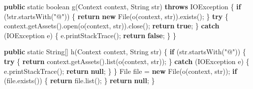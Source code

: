 \documentclass[
]{article}
\newenvironment{Shaded}{}{}
\newcommand{\BuiltInTok}[1]{\textcolor[rgb]{0.00,0.50,0.00}{#1}}
\newcommand{\ControlFlowTok}[1]{\textcolor[rgb]{0.00,0.44,0.13}{\textbf{#1}}}
\newcommand{\DataTypeTok}[1]{\textcolor[rgb]{0.56,0.13,0.00}{#1}}
\newcommand{\FunctionTok}[1]{\textcolor[rgb]{0.02,0.16,0.49}{#1}}
\newcommand{\KeywordTok}[1]{\textcolor[rgb]{0.00,0.44,0.13}{\textbf{#1}}}
\newcommand{\NormalTok}[1]{#1}
\newcommand{\OperatorTok}[1]{\textcolor[rgb]{0.40,0.40,0.40}{#1}}
\newcommand{\StringTok}[1]{\textcolor[rgb]{0.25,0.44,0.63}{#1}}
\begin{document}
\begin{Shaded}
\begin{Highlighting}[]
    \KeywordTok{public} \DataTypeTok{static} \DataTypeTok{boolean} \FunctionTok{g}\OperatorTok{(}\BuiltInTok{Context}\NormalTok{ context}\OperatorTok{,} \BuiltInTok{String}\NormalTok{ str}\OperatorTok{)} \KeywordTok{throws} \BuiltInTok{IOException} \OperatorTok{\{}
        \ControlFlowTok{if} \OperatorTok{(!}\NormalTok{str}\OperatorTok{.}\FunctionTok{startsWith}\OperatorTok{(}\StringTok{"@"}\OperatorTok{))} \OperatorTok{\{}
            \ControlFlowTok{return} \KeywordTok{new} \BuiltInTok{File}\OperatorTok{(}\FunctionTok{o}\OperatorTok{(}\NormalTok{context}\OperatorTok{,}\NormalTok{ str}\OperatorTok{)).}\FunctionTok{exists}\OperatorTok{();}
        \OperatorTok{\}}
        \ControlFlowTok{try} \OperatorTok{\{}
\NormalTok{            context}\OperatorTok{.}\FunctionTok{getAssets}\OperatorTok{().}\FunctionTok{open}\OperatorTok{(}\FunctionTok{o}\OperatorTok{(}\NormalTok{context}\OperatorTok{,}\NormalTok{ str}\OperatorTok{)).}\FunctionTok{close}\OperatorTok{();}
            \ControlFlowTok{return} \KeywordTok{true}\OperatorTok{;}
        \OperatorTok{\}} \ControlFlowTok{catch} \OperatorTok{(}\BuiltInTok{IOException}\NormalTok{ e}\OperatorTok{)} \OperatorTok{\{}
\NormalTok{            e}\OperatorTok{.}\FunctionTok{printStackTrace}\OperatorTok{();}
            \ControlFlowTok{return} \KeywordTok{false}\OperatorTok{;}
        \OperatorTok{\}}
    \OperatorTok{\}}

    \KeywordTok{public} \DataTypeTok{static} \BuiltInTok{String}\OperatorTok{[]} \FunctionTok{h}\OperatorTok{(}\BuiltInTok{Context}\NormalTok{ context}\OperatorTok{,} \BuiltInTok{String}\NormalTok{ str}\OperatorTok{)} \OperatorTok{\{}
        \ControlFlowTok{if} \OperatorTok{(}\NormalTok{str}\OperatorTok{.}\FunctionTok{startsWith}\OperatorTok{(}\StringTok{"@"}\OperatorTok{))} \OperatorTok{\{}
            \ControlFlowTok{try} \OperatorTok{\{}
                \ControlFlowTok{return}\NormalTok{ context}\OperatorTok{.}\FunctionTok{getAssets}\OperatorTok{().}\FunctionTok{list}\OperatorTok{(}\FunctionTok{o}\OperatorTok{(}\NormalTok{context}\OperatorTok{,}\NormalTok{ str}\OperatorTok{));}
            \OperatorTok{\}} \ControlFlowTok{catch} \OperatorTok{(}\BuiltInTok{IOException}\NormalTok{ e}\OperatorTok{)} \OperatorTok{\{}
\NormalTok{                e}\OperatorTok{.}\FunctionTok{printStackTrace}\OperatorTok{();}
                \ControlFlowTok{return} \KeywordTok{null}\OperatorTok{;}
            \OperatorTok{\}}
        \OperatorTok{\}}
        \BuiltInTok{File}\NormalTok{ file }\OperatorTok{=} \KeywordTok{new} \BuiltInTok{File}\OperatorTok{(}\FunctionTok{o}\OperatorTok{(}\NormalTok{context}\OperatorTok{,}\NormalTok{ str}\OperatorTok{));}
        \ControlFlowTok{if} \OperatorTok{(}\NormalTok{file}\OperatorTok{.}\FunctionTok{exists}\OperatorTok{())} \OperatorTok{\{}
            \ControlFlowTok{return}\NormalTok{ file}\OperatorTok{.}\FunctionTok{list}\OperatorTok{();}
        \OperatorTok{\}}
        \ControlFlowTok{return} \KeywordTok{null}\OperatorTok{;}
    \OperatorTok{\}}


\end{Highlighting}
\end{Shaded}
\end{document}
